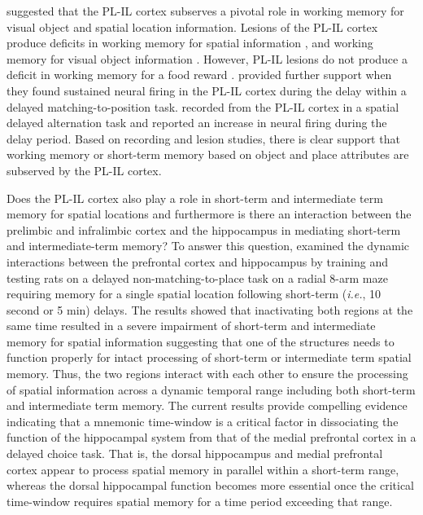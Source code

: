 \documentclass[doc, longtable]{apa6}
\begin{document}
\textcite{Kesner2011a} suggested that the PL-IL cortex subserves a pivotal role in working memory for visual object and spatial location information. Lesions of the PL-IL cortex produce deficits in working memory for spatial information \parencite{Brito1990b, Fritts1998a, Granon1994a, Horst2009a, Ragozzino1999b, Seamans1995a, vanHaaren1988a}, and working memory for visual object information \parencite{DiPietro2004a, Kesner1996, Ragozzino2002d}. However, PL-IL lesions do not produce a deficit in working memory for a food reward \parencite{DeCoteau1997a, Ragozzino1999c}. \textcite{Chang2002a}  provided further support when they found sustained neural firing in the PL-IL cortex during the delay within a delayed matching-to-position task. \textcite{Baeg2003a} recorded from the PL-IL cortex in a spatial delayed alternation task and reported an increase in neural firing during the delay period. Based on recording and lesion studies, there is clear support that working memory or short-term memory based on object and place attributes are subserved by the PL-IL cortex. 

Does the PL-IL cortex also play a role in short-term and intermediate term memory for spatial locations and furthermore is there an interaction between the prelimbic and infralimbic cortex and the hippocampus in mediating short-term and intermediate-term memory? To answer this question, \textcite{Lee2003} examined the dynamic interactions between the prefrontal cortex and hippocampus by training and testing rats on a delayed non-matching-to-place task on a radial 8-arm maze requiring memory for a single spatial location following short-term (\textit{i.e.}, 10 second or 5 min) delays. The results showed that inactivating both regions at the same time resulted in a severe impairment of short-term and intermediate memory for spatial information suggesting that one of the structures needs to function properly for intact processing of short-term or intermediate term spatial memory. Thus, the two regions interact with each other to ensure the processing of spatial information across a dynamic temporal range including both short-term and intermediate term memory. The current results provide compelling evidence indicating that a mnemonic time-window is a critical factor in dissociating the function of the hippocampal system from that of the medial prefrontal cortex in a delayed choice task. That is, the dorsal hippocampus and medial prefrontal cortex appear to process spatial memory in parallel within a short-term range, whereas the dorsal hippocampal function becomes more essential once the critical time-window requires spatial memory for a time period exceeding that range.
\end{document}
